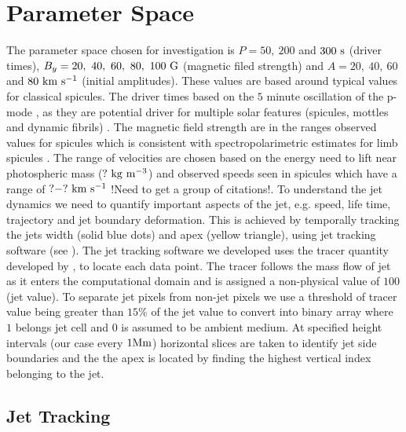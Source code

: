 \section{Parameter Space}
\label{subsec:paramater_space}
The parameter space chosen for investigation is $P=50,~200$ and $300~\rm{s}$ (driver times), $B_y=20,~40,~60,~80,~100~\rm{G}$ (magnetic filed strength) and $A=20,~40,~60$ and $80 ~\rm{km ~s^{-1}}$ (initial amplitudes). These values are based around typical values for classical spicules. The driver times based on the $5$ minute oscillation of the p-mode \citep{Leighton1962ApJ135474L}, as they are potential driver for multiple solar features (spicules, mottles  and dynamic fibrils) \citep{Pontieu2004Natur}. The magnetic field strength are in the ranges observed values for spicules which is consistent with spectropolarimetric estimates for limb spicules \citep{centeno2010, suarez2015}. The range of velocities are chosen based on the energy need to lift near photospheric mass ($?~\rm{kg ~m^{-3}}$) and observed speeds seen in spicules which have a range of $?-?~\rm{km ~s^{-1}}$ !Need to get a group of citations!. \np
%
To understand the jet dynamics we need to quantify important aspects of the jet, e.g. speed, life time, trajectory and jet boundary deformation. This is achieved by temporally tracking the jets width (solid blue dots) and apex (yellow triangle), using jet tracking software (see ). The jet tracking software we developed uses the tracer quantity developed by \cite{Porth_2014}, to locate each data point. The tracer follows the mass flow of jet as it enters the computational domain and is assigned a non-physical value of $100$ (jet value). To separate jet pixels from non-jet pixels we use a threshold of tracer value being greater than $15\%$ of the jet value to convert into binary array where $1$ belongs jet cell and $0$ is assumed to be ambient medium. At specified height intervals (our case every $1 \rm{Mm}$) horizontal slices are taken to identify jet side boundaries and the the apex is located by finding the highest vertical index belonging to the jet.
\subsection{Jet Tracking}
